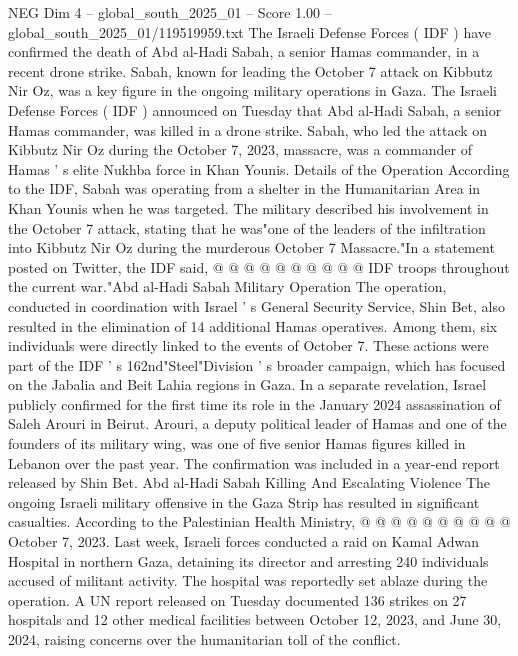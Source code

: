 \begin{textsample}{NEG Dim 4 – global\_south\_2025\_01 – Score 1.00 – global\_south\_2025\_01/119519959.txt}  \label{ex:f4_neg_444}
The Israeli Defense Forces ( IDF ) have confirmed the death of Abd al-Hadi Sabah, a senior Hamas commander, in a recent drone strike.
Sabah, known for leading the October 7 attack on Kibbutz Nir Oz, was a key figure in the ongoing military operations in Gaza.
The Israeli Defense Forces ( IDF ) announced on Tuesday that Abd al-Hadi Sabah, a senior Hamas commander, was killed in a drone strike.
Sabah, who led the attack on Kibbutz Nir Oz during the October 7, 2023, massacre, was a commander of Hamas ' s elite Nukhba force in Khan Younis.
Details of the Operation According to the IDF, Sabah was operating from a shelter in the Humanitarian Area in Khan Younis when he was targeted.
The military described his involvement in the October 7 attack, stating that he was"one of the leaders of the infiltration into Kibbutz Nir Oz during the murderous October 7 Massacre."In a statement posted on Twitter, the IDF said, @ @ @ @ @ @ @ @ @ @ IDF troops throughout the current war."Abd al-Hadi Sabah Military Operation The operation, conducted in coordination with Israel ' s General Security Service, Shin Bet, also resulted in the elimination of 14 additional Hamas operatives.
Among them, six individuals were directly linked to the events of October 7.
These actions were part of the IDF ' s 162nd"Steel"Division ' s broader campaign, which has focused on the Jabalia and Beit Lahia regions in Gaza.
In a separate revelation, Israel publicly confirmed for the first time its role in the January 2024 assassination of Saleh Arouri in Beirut.
Arouri, a deputy political leader of Hamas and one of the founders of its military wing, was one of five senior Hamas figures killed in Lebanon over the past year.
The confirmation was included in a year-end report released by Shin Bet.
Abd al-Hadi Sabah Killing And Escalating Violence The ongoing Israeli military offensive in the Gaza Strip has resulted in significant casualties.
According to the Palestinian Health Ministry, @ @ @ @ @ @ @ @ @ @ October 7, 2023.
Last week, Israeli forces conducted a raid on Kamal Adwan Hospital in northern Gaza, detaining its director and arresting 240 individuals accused of militant activity.
The hospital was reportedly set ablaze during the operation.
A UN report released on Tuesday documented 136 strikes on 27 hospitals and 12 other medical facilities between October 12, 2023, and June 30, 2024, raising concerns over the humanitarian toll of the conflict.

\end{textsample}
